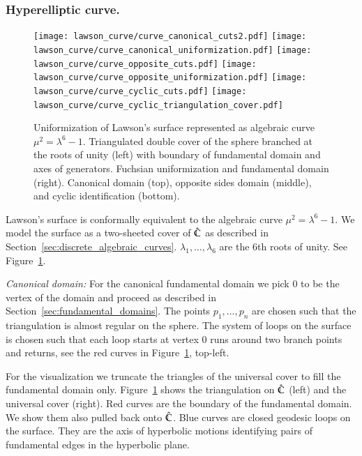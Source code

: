 \documentclass[Thesis.tex]{subfiles}
\begin{document}
\subsubsection{Hyperelliptic curve.}
\label{sec:lawson_curve}

\begin{figure}
	\centering
	\resizebox{!}{6cm} {
	\texttt{[image: lawson\_curve/curve\_canonical\_cuts2.pdf]}
	\texttt{[image: lawson\_curve/curve\_canonical\_uniformization.pdf]}
	}
	\resizebox{!}{6cm} {
	\texttt{[image: lawson\_curve/curve\_opposite\_cuts.pdf]}
	\texttt{[image: lawson\_curve/curve\_opposite\_uniformization.pdf]}
	}
	\resizebox{!}{6cm} {
	\texttt{[image: lawson\_curve/curve\_cyclic\_cuts.pdf]}
	\texttt{[image: lawson\_curve/curve\_cyclic\_triangulation\_cover.pdf]}
	}
	\caption{Uniformization of Lawson's surface represented as algebraic curve $\mu^2=\lambda^6-1$. Triangulated double cover of the sphere branched at the roots of unity (left) with boundary of fundamental domain and axes of generators. Fuchsian uniformization and fundamental domain (right). Canonical domain (top), opposite sides domain (middle), and cyclic identification (bottom).}
	\label{fig:lawson_curve}
\end{figure}

Lawson's surface is conformally equivalent to the algebraic curve $\mu^2=\lambda^6-1$.
We model the surface as a two-sheeted cover of $\hat {\mathbb C}$ as described in Section~\ref{sec:discrete_algebraic_curves}. $\lambda_1,\ldots,\lambda_6$ are the 6th roots of unity.
See Figure~\ref{fig:lawson_curve}.

\textit{Canonical domain:}
For the canonical fundamental domain we pick $0$ to be the vertex of the domain and proceed as described in Section~\ref{sec:fundamental_domains}.
The points $p_1,\ldots,p_n$ are chosen such that the triangulation is almost regular on the sphere.
The system of loops on the surface is chosen such that each loop starts at vertex $0$ runs around two branch points and returns, see the red curves in Figure~\ref{fig:lawson_curve}, top-left.

For the visualization we truncate the triangles of the universal cover to fill the fundamental domain only.
Figure~\ref{fig:lawson_curve} shows the triangulation on $\hat {\mathbb C}$ (left) and the universal cover (right).
Red curves are the boundary of the fundamental domain.
We show them also pulled back onto $\hat {\mathbb C}$. Blue curves are closed geodesic loops on the surface.
They are the axis of hyperbolic motions identifying pairs of fundamental edges in the hyperbolic plane.
\end{document}
